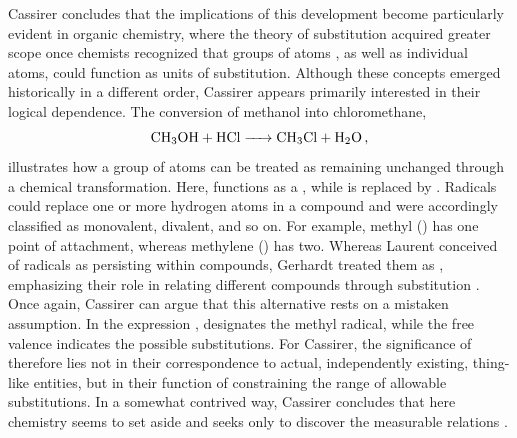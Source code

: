 \documentclass[submitted,12pt]{article}
\renewcommand{\SF}[2]{\citep[#1/#2]{Cassirer1910}}
\begin{document}
Cassirer concludes that the implications of this development become particularly evident in organic chemistry, where the theory of substitution acquired greater scope once chemists recognized that groups of atoms , as well as individual atoms, could function as units of substitution. Although these concepts emerged historically in a different order, Cassirer appears primarily interested in their logical dependence. The conversion of methanol into chloromethane, $$\ce{CH3OH + HCl -> CH3Cl + H2O}\,,$$ illustrates how a group of atoms can be treated as remaining unchanged through a chemical transformation. Here,  functions as a  , while  is replaced by . Radicals could replace one or more hydrogen atoms in a compound and were accordingly classified as monovalent, divalent, and so on. For example, methyl () has one point of attachment, whereas methylene () has two. Whereas Laurent conceived of radicals as  persisting within compounds, Gerhardt treated them as , emphasizing their role in relating different compounds through substitution \SF{286}{215}. Once again, Cassirer can argue that this alternative \citep[175]{Ladenburg1902} rests on a mistaken assumption. In the expression ,  designates the methyl radical, while the free valence indicates the possible substitutions. For Cassirer, the significance of  therefore lies not in their correspondence to actual, independently existing, thing-like entities, but in their function of constraining the range of allowable substitutions. In a somewhat contrived way, Cassirer concludes that here chemistry seems to set aside  and seeks only to discover the measurable relations  \SF{286--87}{215--16}.
\end{document}
